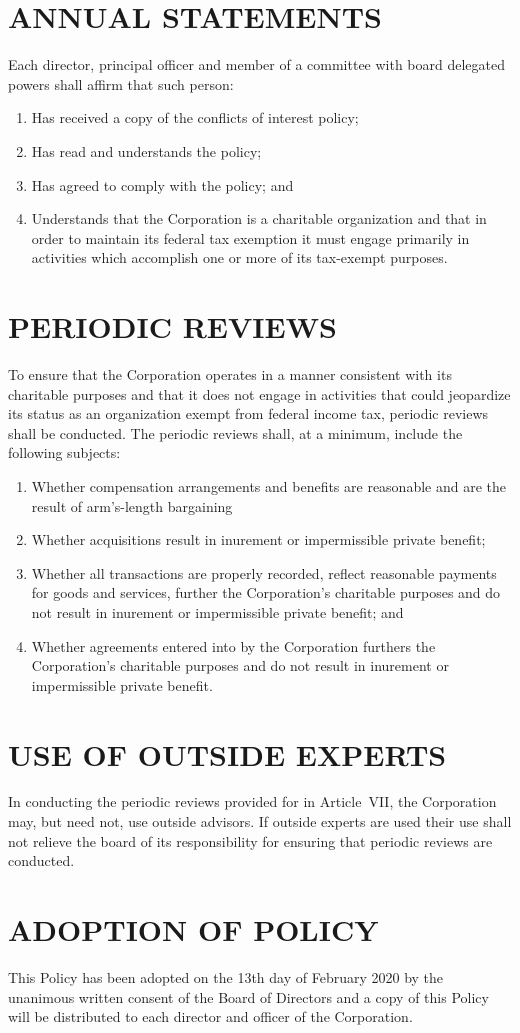 \documentclass{article}
\begin{document}
\section{ANNUAL STATEMENTS}
Each director, principal officer and member of a committee with board delegated powers shall affirm that such person:
\renewcommand{\labelenumi}{\alph{enumi}$)$}
\begin{enumerate}
\item Has received a copy of the conflicts of interest policy;
\item Has read and understands the policy;
\item Has agreed to comply with the policy; and
\item Understands that the Corporation is a charitable organization and that in order to maintain its federal tax exemption it must engage primarily in activities which accomplish one or more of its tax-exempt purposes.
\end{enumerate}
\section{PERIODIC REVIEWS}
To ensure that the Corporation operates in a manner consistent with its charitable purposes and that it does not engage in activities that could jeopardize its status as an organization exempt from federal income tax, periodic reviews shall be conducted.  The periodic reviews shall, at a minimum, include the following subjects:
\renewcommand{\labelenumi}{\alph{enumi}$)$}
\begin{enumerate}
\item Whether compensation arrangements and benefits are reasonable and are the result of arm’s-length bargaining
\item Whether acquisitions result in inurement or impermissible private benefit;
\item Whether all transactions are properly recorded, reflect reasonable payments for goods and services, further the Corporation’s charitable purposes and do not result in inurement or impermissible private benefit; and
\item Whether agreements entered into by the Corporation furthers the Corporation’s charitable purposes and do not result in inurement or impermissible private benefit.
\end{enumerate}
\section{USE OF OUTSIDE EXPERTS}
In conducting the periodic reviews provided for in Article VII, the Corporation may, but need not, use outside advisors.  If outside experts are used their use shall not relieve the board of its responsibility for ensuring that periodic reviews are conducted.
\section{ADOPTION OF POLICY}
This Policy has been adopted on the 13th day of February 2020 by the unanimous written consent of the Board of Directors and a copy of this Policy will be distributed to each director and officer of the Corporation.
\end{document}
